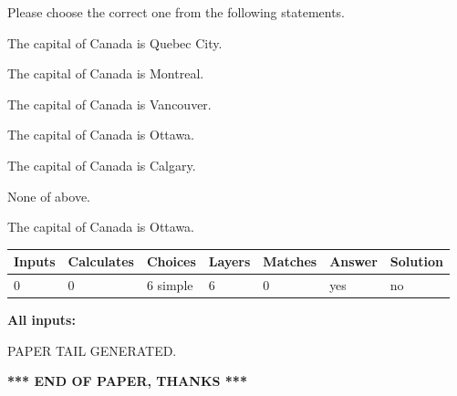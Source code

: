 \documentclass[12pt]{article}
\begin{document}
  
Please choose the correct one from the following statements.
 
 
The capital of Canada is Quebec City.
 
 
The capital of Canada is Montreal.
 
 
The capital of Canada is Vancouver.
 
 
The capital of Canada is Ottawa.
 
 
The capital of Canada is Calgary.
 
 
 None of above.
 
 
\noindent{}
 
 
The capital of Canada is Ottawa.
 
 
\noindent{}
 
 
   
   
   
   
\noindent\begin{tabular}{|l|l|l|l|l|l|l|}
 \hline
Inputs & Calculates & Choices & Layers & Matches & Answer & Solution \\ \hline
 0  & 
 0  & 
 6
  simple  
  & 
 6  & 
 0  & 
  yes & 
  no 
  \\ \hline
 \end{tabular}
   
   
   
   
\noindent{}
   
   
   
   
\noindent\vspace{0.1in}\hspace{-0.08in} {\textbf{\Large{All inputs: }}}
   
   
   
   
   
   
 \vspace{0.2in}
 
   
   
\vspace{2.0in} PAPER TAIL GENERATED.
   
   
   
   
\vspace{1.0in} 
{\textbf{\large{ *** END OF PAPER, THANKS *** }}} 
   
\end{document}
